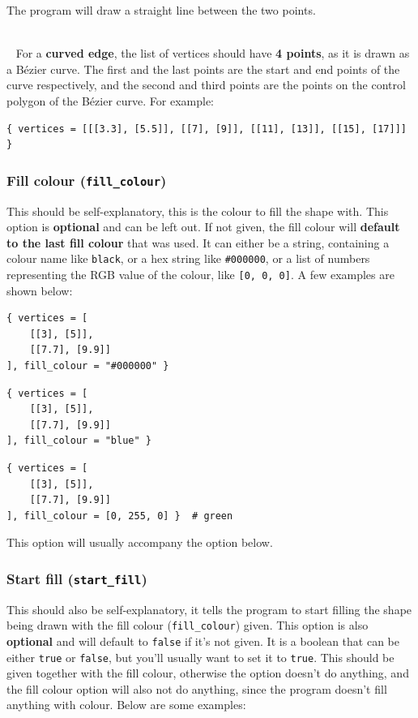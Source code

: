 \documentclass[11pt]{article}
\begin{document}
 \noindent The program will draw a straight line between the two points.

 ~\\~ \noindent For a \textbf{curved edge}, the list of vertices should have \textbf{4 points}, as it is drawn as a Bézier curve. The first and the last points are the start and end points of the curve respectively, and the second and third points are the points on the control polygon of the Bézier curve. For example:
\begin{verbatim}
{ vertices = [[[3.3], [5.5]], [[7], [9]], [[11], [13]], [[15], [17]]] }
\end{verbatim}

 \newpage

\subsubsection{Fill colour (\texttt{fill\_colour})}
\label{sec:org7b42588}
This should be self-explanatory, this is the colour to fill the shape with. This option is \textbf{optional} and can be left out. If not given, the fill colour will \textbf{default to the last fill colour} that was used. It can either be a string, containing a colour name like \texttt{black}, or a hex string like \texttt{\#000000}, or a list of numbers representing the RGB value of the colour, like \texttt{[0, 0, 0]}. A few examples are shown below:

\begin{verbatim}
{ vertices = [
    [[3], [5]],
    [[7.7], [9.9]]
], fill_colour = "#000000" }
\end{verbatim}

\begin{verbatim}
{ vertices = [
    [[3], [5]],
    [[7.7], [9.9]]
], fill_colour = "blue" }
\end{verbatim}

\begin{verbatim}
{ vertices = [
    [[3], [5]],
    [[7.7], [9.9]]
], fill_colour = [0, 255, 0] }  # green
\end{verbatim}

 \noindent This option will usually accompany the option below.

 \newpage

\subsubsection{Start fill (\texttt{start\_fill})}
\label{sec:org6baf9f1}
This should also be self-explanatory, it tells the program to start filling the shape being drawn with the fill colour (\texttt{fill\_colour}) given. This option is also \textbf{optional} and will default to \texttt{false} if it's not given. It is a boolean that can be either \texttt{true} or \texttt{false}, but you'll usually want to set it to \texttt{true}. This should be given together with the fill colour, otherwise the option doesn't do anything, and the fill colour option will also not do anything, since the program doesn't fill anything with colour. Below are some examples:
\end{document}
